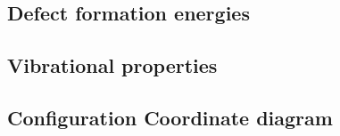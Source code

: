 \subsection{Defect formation energies}


\subsection{Vibrational properties}

\subsection{Configuration Coordinate diagram}





